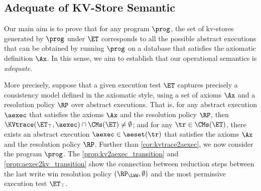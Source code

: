 \subsection{Adequate of KV-Store Semantic}

Our main aim is to prove that for any program $\prog$, 
the set of  kv-stores generated by $\prog$ under $\ET$ 
corresponds to all the possible abstract executions that 
can be obtained by running $\prog$ on a database that satisfies the axiomatic definition $\Ax$. 
In this sense, we aim to establish that our operational semantics is \emph{adequate}.

More precisely, suppose that a given execution test $\ET$ captures precisely 
a consistency model defined in the axiomatic style, using a set of 
axioms $\Ax$ and a resolution policy $\RP$ over abstract executions.
That is, for any abstract execution $\aexec$ that satisfies 
the axioms $\Ax$ and the resolution policy $\RP$, then $\KVtrace(\ET_{\top}, \aexec) \cap \CMs(\ET) \neq \emptyset$; 
and for any $\tr \in \CMs(\ET)$, there exists an abstract execution 
$\aexec \in \aeset(\tr)$ that satisfies the axioms $\Ax$ and the resolution policy $\RP$. 
%
Further than \cref{cor:kvtrace2aexec}, we now consider the program \( \prog \).
The \cref{prop:kv2aexec_transition} and \cref{prop:aexec2kv_transition} show 
the connection between reduction steps between 
the last write win resolution policy \( (\RP_{\LWW}, \emptyset) \) 
and the most permissive execution test \( \ET_\top \).

